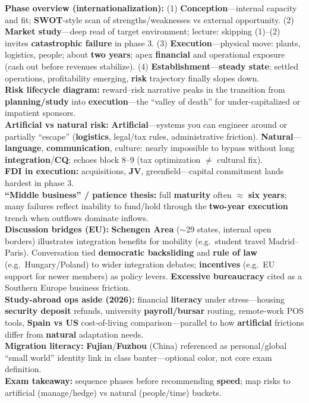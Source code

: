 \documentclass[10pt,a4paper]{article}
\begin{document}
{
\textbf{Phase overview (internationalization):} (1) \textbf{Conception}---internal capacity and fit; \textbf{SWOT}-style scan of strengths/weaknesses vs external opportunity. (2) \textbf{Market study}---deep read of target environment; lecture: skipping (1)--(2) invites \textbf{catastrophic failure} in phase 3. (3) \textbf{Execution}---physical move: plants, logistics, people; about \textbf{two years}; apex \textbf{financial} and operational exposure (cash out before revenues stabilize). (4) \textbf{Establishment}---\textbf{steady state}: settled operations, profitability emerging, \textbf{risk} trajectory finally slopes down.\\
\textbf{Risk lifecycle diagram:} reward--risk narrative peaks in the transition from \textbf{planning/study} into \textbf{execution}---the ``valley of death'' for under-capitalized or impatient sponsors.\\
\textbf{Artificial vs natural risk:} \textbf{Artificial}---systems you can engineer around or partially ``escape'' (\textbf{logistics}, legal/tax rules, administrative friction). \textbf{Natural}---\textbf{language}, \textbf{communication}, culture: nearly impossible to bypass without long \textbf{integration}/\textbf{CQ}; echoes block 8--9 (tax optimization $\neq$ cultural fix).\\
\textbf{FDI in execution:} acquisitions, \textbf{JV}, greenfield---capital commitment lands hardest in phase 3.\\
\textbf{``Middle business'' / patience thesis:} full \textbf{maturity} often $\approx$ \textbf{six years}; many failures reflect inability to fund/hold through the \textbf{two-year execution} trench when outflows dominate inflows.\\
\textbf{Discussion bridges (EU):} \textbf{Schengen Area} ($\sim$29 states, internal open borders) illustrates integration benefits for mobility (e.g.\ student travel Madrid--Paris). Conversation tied \textbf{democratic backsliding} and \textbf{rule of law} (e.g.\ Hungary/Poland) to wider integration debates; \textbf{incentives} (e.g.\ EU support for newer members) as policy levers. \textbf{Excessive bureaucracy} cited as a Southern Europe business friction.\\
\textbf{Study-abroad ops aside (2026):} financial \textbf{literacy} under stress---housing \textbf{security deposit} refunds, university \textbf{payroll/bursar} routing, remote-work POS tools, \textbf{Spain vs US} cost-of-living comparison---parallel to how \textbf{artificial} frictions differ from \textbf{natural} adaptation needs.\\
\textbf{Migration literacy:} \textbf{Fujian}/\textbf{Fuzhou} (China) referenced as personal/global ``small world'' identity link in class banter---optional color, not core exam definition.\\
\textbf{Exam takeaway:} sequence phases before recommending \textbf{speed}; map risks to artificial (manage/hedge) vs natural (people/time) buckets.
}
\end{document}
